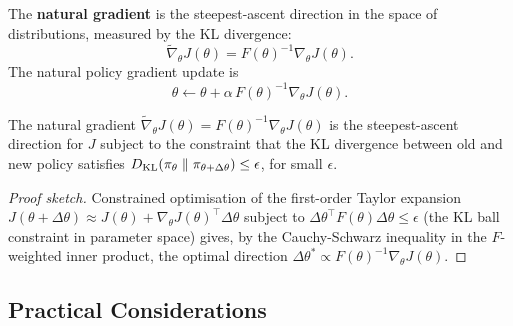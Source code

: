 The \textbf{natural gradient} is the steepest-ascent direction in the space of distributions, measured by the KL divergence:
\begin{equation}
\label{eq:natural-gradient}
\tilde\nabla_\theta J(\theta) = F(\theta)^{-1} \nabla_\theta J(\theta).
\end{equation}
The natural policy gradient update is
\begin{equation}
\label{eq:npg-update}
\theta \leftarrow \theta + \alpha\, F(\theta)^{-1} \nabla_\theta J(\theta).
\end{equation}

\begin{theorem}
\label{thm:npg}
The natural gradient $\tilde\nabla_\theta J(\theta) = F(\theta)^{-1} \nabla_\theta J(\theta)$ is the steepest-ascent direction for $J$ subject to the constraint that the KL divergence between old and new policy satisfies $D_{\mathrm{KL}}\!\left(\pi_\theta\;\|\;\pi_{\theta + \Delta\theta}\right) \leq \epsilon$, for small $\epsilon$.
\end{theorem}

\begin{proof}[Proof sketch]
Constrained optimisation of the first-order Taylor expansion $J(\theta + \Delta\theta) \approx J(\theta) + \nabla_\theta J(\theta)^\top \Delta\theta$ subject to $\Delta\theta^\top F(\theta) \Delta\theta \leq \epsilon$ (the KL ball constraint in parameter space) gives, by the Cauchy-Schwarz inequality in the $F$-weighted inner product, the optimal direction $\Delta\theta^* \propto F(\theta)^{-1} \nabla_\theta J(\theta)$.
\end{proof}

\subsection{Practical Considerations}

